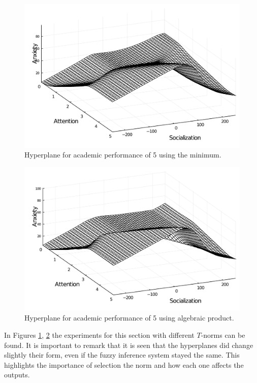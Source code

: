 \documentclass[conference]{IEEEtran}
\theoremstyle{definition}
\theoremstyle{remark}
\theoremstyle{remark}
\begin{document}
\begin{figure}[t]
  \centering
  \includegraphics[scale=.3]{figs/high_ap}
  \caption{Hyperplane for academic performance of 5 using the minimum.}
  \label{fig:high_ap}
\end{figure}

\begin{figure}[t]
  \centering
  \includegraphics[scale=.3]{figs/high_ap-a-prod}
  \caption{Hyperplane for academic performance of 5 using algebraic product.}
  \label{fig:high_ap_a_prod}
\end{figure}

In Figures \ref{fig:high_ap}, \ref{fig:high_ap_a_prod} the experiments for this
section with different $T$-norms can be found. It is important to remark that it
is seen that the hyperplanes did change slightly their form, even if the fuzzy
inference system stayed the same. This highlights the importance of selection the
norm and how each one affects the outputs.
\end{document}
